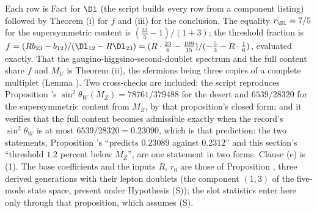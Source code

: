 Each row is Fact  for $\Dl$ (the script builds every row from a component listing) followed by Theorem (i) for $f$ and (iii) for the conclusion. The equality $r_{\Dl} = 7/5$ for the supersymmetric content is $(\tfrac{33}{5} - 1)/(1 + 3)$; the threshold fraction is $f = (Rb_{23} - b_{12})/(\Dl_{12} - R\Dl_{23}) = (R \cdot \tfrac{23}{6} - \tfrac{109}{15})/(-\tfrac53 - R \cdot \tfrac16)$, evaluated exactly. That the gaugino-higgsino-second-doublet spectrum and the full content share $f$ and $M_{U}$ is Theorem (ii), the sfermions being three copies of a complete multiplet (Lemma ). Two cross-checks are included: the script reproduces Proposition 's $\sin^{2}\theta_{W}(M_{Z}) = 78761/379488$ for the desert and $6539/28320$ for the supersymmetric content from $M_{Z}$, by that proposition's closed form; and it verifies that the full content becomes admissible exactly when the record's $\sin^{2}\theta_{W}$ is at most $6539/28320 = 0.23090$, which is that prediction: the two statements, Proposition 's ``predicts $0.23089$ against $0.2312$'' and this section's ``threshold $1.2$ percent below $M_{Z}$'', are one statement in two forms. Clause (e) is (1). The base coefficients and the inputs $R$, $r_{0}$ are those of Proposition , three derived generations with their lepton doublets (the component $(1,3)$ of the five-mode state space, present under Hypothesis (S)); the slot statistics enter here only through that proposition, which assumes (S).

